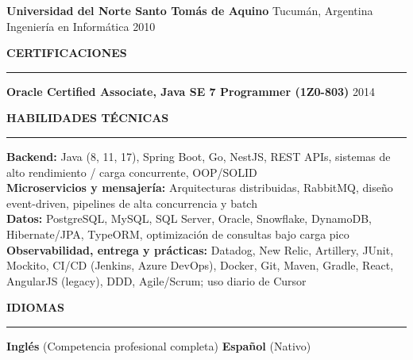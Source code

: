 \documentclass[11pt]{article}
\begin{document}
\textbf{Universidad del Norte Santo Tomás de Aquino} \hfill Tucumán, Argentina\\
Ingeniería en Informática \hfill 2010

\vspace{20pt}

{\large \textbf{CERTIFICACIONES}}\\[3pt]
\hrule
\vspace{3pt}

\textbf{Oracle Certified Associate, Java SE 7 Programmer (1Z0-803)} \hfill 2014

\vspace{20pt}

\enlargethispage{3\baselineskip}

{\large \textbf{HABILIDADES TÉCNICAS}}\\[3pt]
\hrule
\vspace{3pt}

\textbf{Backend:} Java (8, 11, 17), Spring Boot, Go, NestJS, REST APIs, sistemas de alto rendimiento / carga concurrente, OOP/SOLID \\
\textbf{Microservicios y mensajería:} Arquitecturas distribuidas, RabbitMQ, diseño event-driven, pipelines de alta concurrencia y batch \\
\textbf{Datos:} PostgreSQL, MySQL, SQL Server, Oracle, Snowflake, DynamoDB, Hibernate/JPA, TypeORM, optimización de consultas bajo carga pico \\
\textbf{Observabilidad, entrega y prácticas:} Datadog, New Relic, Artillery, JUnit, Mockito, CI/CD (Jenkins, Azure DevOps), Docker, Git, Maven, Gradle, React, AngularJS (legacy), DDD, Agile/Scrum; uso diario de Cursor

\vspace{6pt}

{\large \textbf{IDIOMAS}}\\[3pt]
\hrule
\vspace{3pt}

\textbf{Inglés} (Competencia profesional completa) \quad \textbf{Español} (Nativo)
\end{document}
